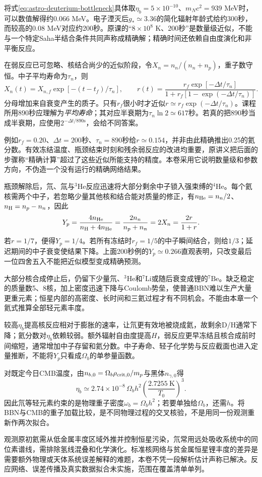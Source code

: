 将式\eqref{eq:astro-deuterium-bottleneck}具体取$\eta_b=5\times10^{-10}$、$m_Nc^2=939$ MeV时，可以数值解得约0.066 MeV。电子湮灭后$g_*\simeq3.36$的简化辐射年龄式给约300秒，而较高的0.08 MeV对应约200秒。原课的“$8\times10^8$ K、200秒”是数量级近似，不能与一个特定Saha半结合条件共同声称成精确解；精确时间还依赖自由度演化和非平衡反应。

在弱反应已可忽略、核结合尚少的近似阶段，令$X_n=n_n/(n_n+n_p)$，重子数守恒。中子平均寿命为$\tau_n$，则
\[
 X_n(t)=X_{n,f}\exp[-(t-t_f)/\tau_n],\qquad
 r(t)=\frac{r_f\exp[-\Delta t/\tau_n]}
 {1+r_f[1-\exp(-\Delta t/\tau_n)]}.
\]
分母增加来自衰变产生的质子。只有$r_f$很小时才近似$r\simeq r_f\exp(-\Delta t/\tau_n)$。课程所用890秒应理解为\emph{平均寿命}；其对应半衰期为$\tau_n\ln2\simeq617$秒。若真的把890秒当成半衰期，应使用$2^{-\Delta t/890\mathrm s}$，会给不同答案。

例如$r_f=0.20$、$\Delta t=200$秒、$\tau_n=890$秒给$r\simeq0.154$，并非由此精确推出0.25的氦分数。有效冻结温度、瓶颈结束时刻和残余弱反应的改进均重要，原讲义把后面的步骤称“精确计算”超过了这些近似所能支持的精度。本卷采用它说明数量级和参数方向，不伪造一个没有运行的精确网络结果。

瓶颈解除后，氘、氚与${}^3\mathrm{He}$反应迅速将大部分剩余中子锁入强束缚的${}^4\mathrm{He}$。每个氦核需两个中子，若忽略少量其他核和结合能对质量的修正，有$n_{\rm He}=n_n/2$、$n_{\rm H}=n_p-n_n$，因此
\begin{equation}\label{eq:astro-helium-fraction}
 Y_p=\frac{4n_{\rm He}}{n_{ \rm H}+4n_{\rm He}}
 =\frac{2n_n}{n_p+n_n}=2X_n=\frac{2r}{1+r}.
\end{equation}
若$r=1/7$，便得$Y_p=1/4$。若所有冻结时$r_f=1/5$的中子瞬间结合，则给$1/3$；延迟期间的中子衰变使结果下降。上面200秒例的$Y_p\simeq0.266$直观表明，只改变最后一位四舍五入不能把近似模型变成精确预测。

大部分核合成停止后，仍留下少量氘、${}^3\mathrm{He}$和${}^7\mathrm{Li}$或随后衰变成锂的${}^7\mathrm{Be}$。缺乏稳定的质量数5、8核，加上密度迅速下降与Coulomb势垒，使普通BBN难以生产大量更重元素；恒星内部的高密度、长时间和三氦过程才有不同机会。不能由本章一个氦式推算全部轻元素丰度。

较高$\eta_b$提高核反应相对于膨胀的速率，让氘更有效地被烧成氦，故剩余D/H通常下降；氦分数对$\eta_b$依赖较弱。额外辐射自由度提高$H$，弱反应更早冻结且核合成前时间缩短，通常增加中子存留和氦分数。中子寿命、轻子化学势与反应截面也进入定量推断，不能将$Y_p$只看成$\Omega_b$的单参量函数。

对既定今日CMB温度，由$n_{b,0}=\Omega_b\rho_{ \rm crit,0}/m_p$与黑体$n_{\gamma,0}$得
\[
 \eta_b\simeq2.74\times10^{-8}\,\Omega_bh^2
 \left(\frac{2.7255\ \mathrm K}{T_0}\right)^3.
\]
因此氘等轻元素约束的是物理重子密度$\omega_b=\Omega_bh^2$；若要单独给$\Omega_b$，还需$h$。将BBN与CMB的重子加载比较，是不同物理过程的交叉核验，不是用同一份观测重新作两次拟合。

观测原初氦需从低金属丰度区域外推并控制恒星污染，氘常用远处吸收系统中的同位素谱线，需排除氢线混叠和化学演化。标准核网络与贫金属恒星锂丰度的差异是需要额外物理或天体系统误差解释的难题，本卷不凭一段解析估计声称已解决。反应网络、误差传播及真实数据拟合未实施，范围在覆盖清单单列。
